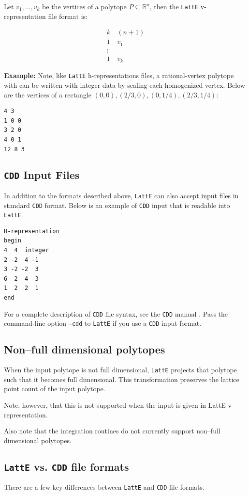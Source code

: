 \documentclass{article}
\newcommand{\R}{{\mathbb R}}
\newcommand{\latte}{{\tt LattE}\xspace}
\newcommand{\cdd}{{\tt CDD}\xspace}
\newcommand{\example}{{\bf Example:\space}}
\begin{document}
Let $v_1, \dots, v_k$ be the vertices of a polytope $P \subseteq \R^n$, then the \latte v-representation file format is:

\begin{align*}
        k &\: (n+1)\\
        1 &\: v_1\\
        \vdots & \\
        1 &\: v_k
\end{align*}


\example
Note, like \latte h-representations files, a rational-vertex polytope with can be written with integer data by scaling each homogenized vertex. Below are the vertices of a rectangle $(0,0), (2/3,0), (0,1/4), (2/3, 1/4)$:
\begin{verbatim}
4 3
1 0 0
3 2 0
4 0 1
12 8 3
\end{verbatim}

\subsection{\cdd Input Files}
In addition to the formats described above, {\tt LattE} can also
accept input files in standard \cdd format. Below is
an example of \cdd input that is readable into \latte.
\begin{verbatim}
H-representation
begin
4  4  integer
2 -2  4 -1
3 -2 -2  3
6  2 -4 -3
1  2  2  1
end
\end{verbatim}

For a complete description of \cdd file syntax, see the \cdd manual \cite{fukuda}.
Pass the command-line option \texttt{--cdd} to \latte if you use a \cdd input format.

\subsection{Non--full dimensional polytopes}

When the input polytope is not full dimensional, \latte projects that polytope
such that it becomes full dimensional. This transformation preserves the
lattice point count of the input polytope. 

Note, however, that this is not supported when the input is given in LattE
v-representation. 

Also note that the integration routines do not currently support non--full
dimensional polytopes.

\subsection{\latte vs. \cdd file formats}
There are a few key differences between \latte and \cdd file formats.
\end{document}

